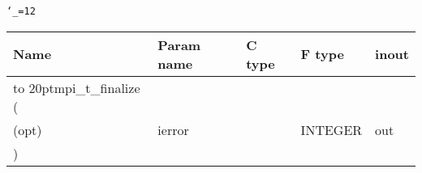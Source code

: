 \begingroup\tt\catcode`\_=12
\begin{tabular}{lllll}
\toprule
\textrm{Name}&\textrm{Param name}&\textrm{C type}&\textrm{F type}&\textrm{inout}\\
\midrule
\hbox to 20pt{mpi_t_finalize (\hss} \\
(opt)&ierror&&INTEGER&out\\
)\\
\bottomrule
\end{tabular}
\endgroup


